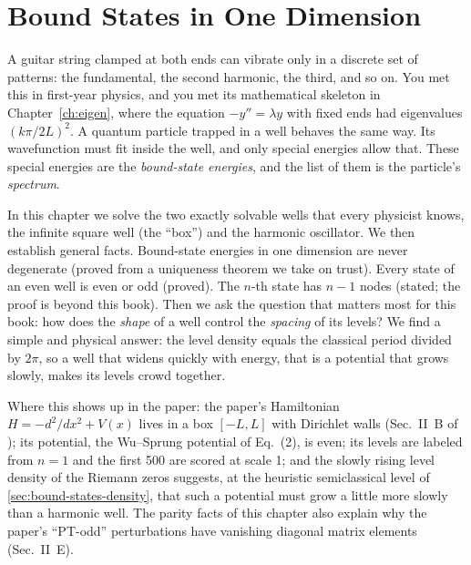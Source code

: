 \chapter{Bound States in One Dimension}\label{ch:bound-states}

\begin{chapterintro}
A guitar string clamped at both ends can vibrate only in a discrete set of patterns: the fundamental, the second harmonic, the third, and so on. You met this in first-year physics, and you met its mathematical skeleton in Chapter~\ref{ch:eigen}, where the equation $-y''=\lambda y$ with fixed ends had eigenvalues $(k\pi/2L)^2$. A quantum particle trapped in a well behaves the same way. Its wavefunction must fit inside the well, and only special energies allow that. These special energies are the \emph{bound-state energies}, and the list of them is the particle's \emph{spectrum}.

In this chapter we solve the two exactly solvable wells that every physicist knows, the infinite square well (the ``box'') and the harmonic oscillator. We then establish general facts. Bound-state energies in one dimension are never degenerate (proved from a uniqueness theorem we take on trust). Every state of an even well is even or odd (proved). The $n$-th state has $n-1$ nodes (stated; the proof is beyond this book). Then we ask the question that matters most for this book: how does the \emph{shape} of a well control the \emph{spacing} of its levels? We find a simple and physical answer: the level density equals the classical period divided by $2\pi$, so a well that widens quickly with energy, that is a potential that grows slowly, makes its levels crowd together.

Where this shows up in the paper: the paper's Hamiltonian $H=-d^2/dx^2+V(x)$ lives in a box $[-L,L]$ with Dirichlet walls (Sec.~II~B of \cite{soniR1}); its potential, the Wu--Sprung potential of Eq.~(2), is even; its levels are labeled from $n=1$ and the first 500 are scored at scale 1; and the slowly rising level density of the Riemann zeros suggests, at the heuristic semiclassical level of \cref{sec:bound-states-density}, that such a potential must grow a little more slowly than a harmonic well. The parity facts of this chapter also explain why the paper's ``PT-odd'' perturbations have vanishing diagonal matrix elements (Sec.~II~E).
\end{chapterintro}

